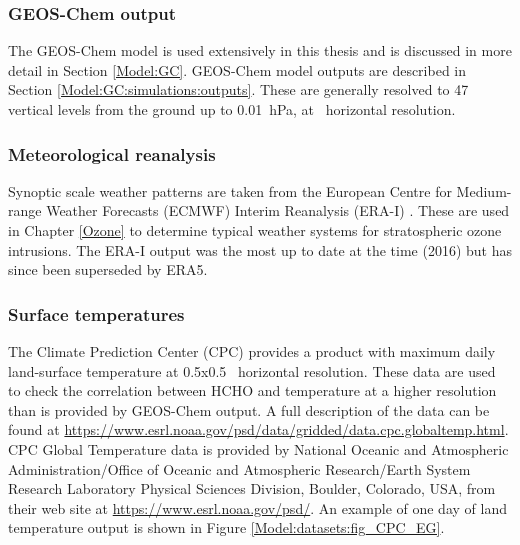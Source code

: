     \subsubsection{GEOS-Chem output}
      
      The GEOS-Chem model is used extensively in this thesis and is discussed in more detail in Section \ref{Model:GC}.
      GEOS-Chem model outputs are described in Section \ref{Model:GC:simulations:outputs}.
      These are generally resolved to 47 vertical levels from the ground up to 0.01~hPa, at \lowhr ~horizontal resolution.
    
    \subsubsection{Meteorological reanalysis}
      \label{Model:datasets:ERAI}
      
      Synoptic scale weather patterns are taken from the European Centre for Medium-range Weather Forecasts (ECMWF) Interim Reanalysis (ERA-I) \parencite{Dee2011}.
      These are used in Chapter \ref{Ozone} to determine typical weather systems for stratospheric ozone intrusions.
      The ERA-I output was the most up to date at the time (2016) but has since been superseded by ERA5.
    
    \subsubsection{Surface temperatures}
    \label{Model:datasets:model:CPC}
      The Climate Prediction Center (CPC) provides a product with maximum daily land-surface temperature at 0.5\degr x0.5\degr ~ horizontal resolution. 
      These data are used to check the correlation between HCHO and temperature at a higher resolution than is provided by GEOS-Chem output.
      A full description of the data can be found at \url{https://www.esrl.noaa.gov/psd/data/gridded/data.cpc.globaltemp.html}.
      CPC Global Temperature data is provided by National Oceanic and Atmospheric Administration/Office of Oceanic and Atmospheric Research/Earth System Research Laboratory Physical Sciences Division, Boulder, Colorado, USA, from their web site at \url{https://www.esrl.noaa.gov/psd/}.
      An example of one day of land temperature output is shown in Figure \ref{Model:datasets:fig_CPC_EG}.
      
  
